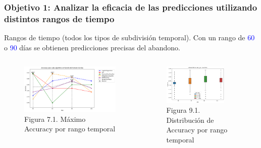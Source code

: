 \documentclass{beamer}
\begin{document}
\begin{frame}
	\frametitle{Objetivo 1: Analizar la eficacia de las predicciones utilizando distintos rangos de tiempo}
	\begin{block}{Rangos de tiempo (todos los tipos de subdivisión temporal).} 
		Con un rango de \textcolor{blue}{60} o \textcolor{blue}{90} días se obtienen predicciones precisas del abandono.
		
	\end{block}
	\begin{columns}[c]
		\begin{column}{.5\textwidth}
			\begin{figure}
				\centering
				\includegraphics[width=1\textwidth]{figs/cap6/figura_1}
				\caption{Figura 7.1. Máximo Accuracy por rango temporal}
			\end{figure}      
		\end{column}
		\begin{column}{.5\textwidth}
			\begin{figure}
				\centering
				\includegraphics[width=0.8\textwidth]{figs/cap7/figura_1}
				\caption{Figura 9.1. Distribución de Accuracy por rango temporal}
			\end{figure}
		\end{column}
	\end{columns}
	
\end{frame}
\end{document}
